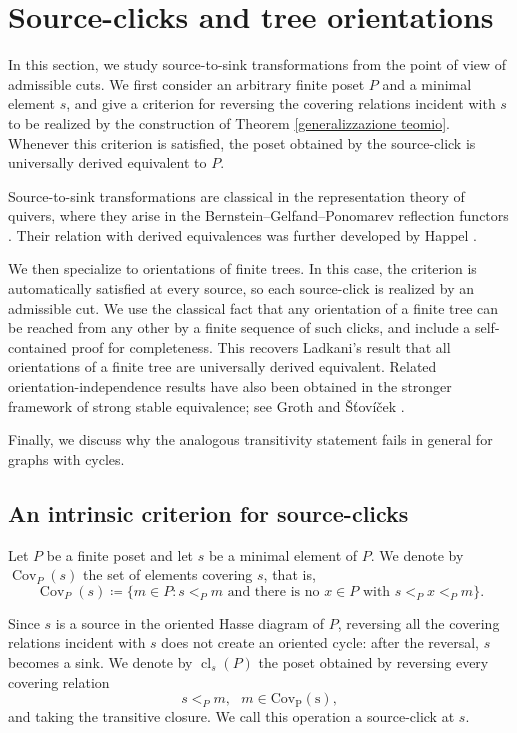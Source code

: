 \section{Source-clicks and tree orientations}

In this section, we study source-to-sink transformations from the point of view of admissible cuts. We first consider an arbitrary finite poset $P$ and a minimal element $s$, and give a criterion for reversing the covering relations incident with $s$ to be realized by the construction of Theorem \ref{generalizzazione teomio}. Whenever this criterion is satisfied, the poset obtained by the source-click is universally derived equivalent to $P$.

Source-to-sink transformations are classical in the representation theory of quivers, where they arise in the Bernstein--Gelfand--Ponomarev reflection functors \cite{BGP}. Their relation with derived equivalences was further developed by Happel \cite{Happel}. 

We then specialize to orientations of finite trees. In this case, the criterion is automatically satisfied at every source, so each source-click is realized by an admissible cut. We use the classical fact that any orientation of a finite tree can be reached from any other by a finite sequence of such clicks, and include a self-contained proof for completeness. This recovers Ladkani's result \cite[Corollary 1.8]{ladkani} that all orientations of a finite tree are universally derived equivalent. Related orientation-independence results have also been obtained in the stronger framework of strong stable equivalence; see Groth and Šťovíček \cite[Corollary 9.23]{Groth}.

Finally, we discuss why the analogous transitivity statement fails in general for graphs with cycles.


\subsection{An intrinsic criterion for source-clicks} \label{An intrinsic criterion for source-clicks}

Let $P$ be a finite poset and let $s$ be a minimal element of $P$. We denote by $\operatorname{Cov}_P(s)$ the set of elements covering $s$, that is, \[\operatorname{Cov}_P(s) \coloneq \{m \in P \colon s <_Pm \text{ and there is no } x \in P \text{ with } s<_Px<_Pm\}.\]

Since $s$ is a source in the oriented Hasse diagram of $P$, reversing all the covering relations incident with $s$ does not create an oriented cycle: after the reversal, $s$ becomes a sink. We denote by $\operatorname{cl}_s(P)$ the poset obtained by reversing every covering relation \[s <_Pm, \,\,\,\, m \in \operatorname{{Cov}_P(s)},\]
and taking the transitive closure. We call this operation a source-click at $s$.

